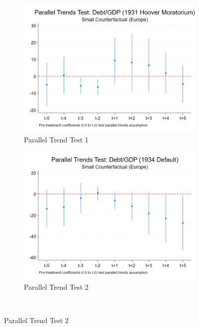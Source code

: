 \begin{figure}[ht!]
    \centering
    \begin{subfigure}[b]{0.48\textwidth}
        \centering
        \includegraphics[width=\textwidth]{figures/PT_Debt_1931_Small.png}
        \caption{Parallel Trend Test 1}
        \label{fig:pt1}
    \end{subfigure}
    \hfill
    \begin{subfigure}[b]{0.48\textwidth}
        \centering
        \includegraphics[width=\textwidth]{figures/PT_Debt_1934_Small.png}
        \caption{Parallel Trend Test 2}
        \label{fig:pt2}
    \end{subfigure}
    \\[1em]

\end{figure}
